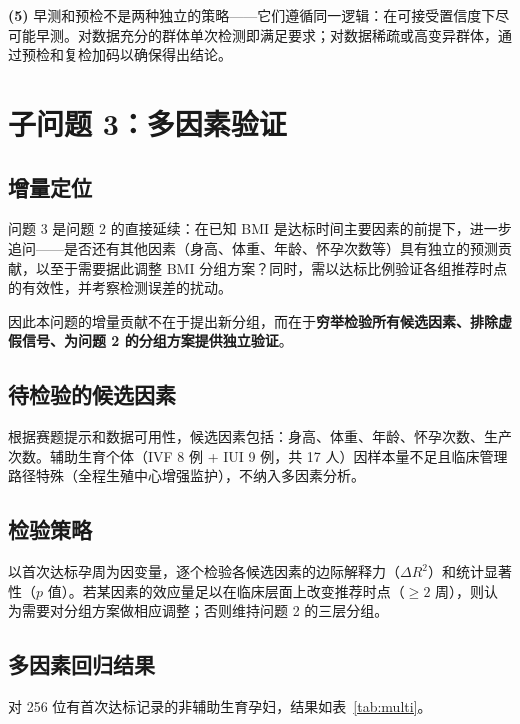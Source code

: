 \documentclass{mcm-paper}
\begin{document}
\textbf{(5)} 早测和预检不是两种独立的策略——它们遵循同一逻辑：在可接受置信度下尽可能早测。对数据充分的群体单次检测即满足要求；对数据稀疏或高变异群体，通过预检和复检加码以确保得出结论。

\newpage

\section{子问题 3：多因素验证}

\subsection{增量定位}

问题 3 是问题 2 的直接延续：在已知 BMI 是达标时间主要因素的前提下，进一步追问——是否还有其他因素（身高、体重、年龄、怀孕次数等）具有独立的预测贡献，以至于需要据此调整 BMI 分组方案？同时，需以达标比例验证各组推荐时点的有效性，并考察检测误差的扰动。

因此本问题的增量贡献不在于提出新分组，而在于\textbf{穷举检验所有候选因素、排除虚假信号、为问题 2 的分组方案提供独立验证}。

\subsection{待检验的候选因素}

根据赛题提示和数据可用性，候选因素包括：身高、体重、年龄、怀孕次数、生产次数。辅助生育个体（IVF 8 例 + IUI 9 例，共 17 人）因样本量不足且临床管理路径特殊（全程生殖中心增强监护），不纳入多因素分析。

\subsection{检验策略}

以首次达标孕周为因变量，逐个检验各候选因素的边际解释力（$\Delta R^2$）和统计显著性（$p$ 值）。若某因素的效应量足以在临床层面上改变推荐时点（$\geq 2$ 周），则认为需要对分组方案做相应调整；否则维持问题 2 的三层分组。

\subsection{多因素回归结果}

对 256 位有首次达标记录的非辅助生育孕妇，结果如表~\ref{tab:multi}。
\end{document}

